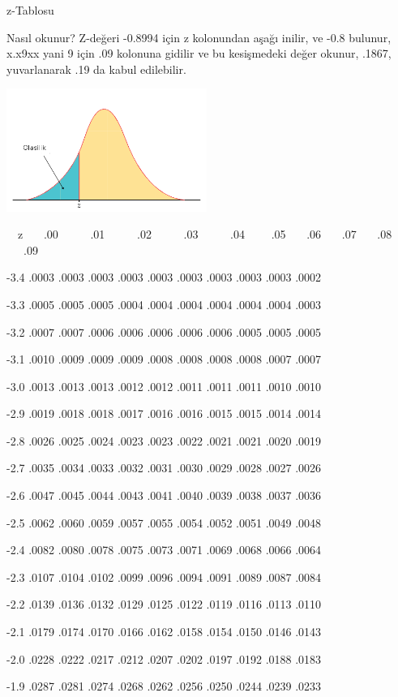 \documentclass[12pt,fleqn]{article}\usepackage{../../common}
\begin{document}
z-Tablosu

Nasıl okunur? Z-değeri -0.8994 için z kolonundan aşağı inilir, ve -0.8
bulunur, x.x9xx yani 9 için .09 kolonuna gidilir ve bu kesişmedeki değer
okunur, .1867, yuvarlanarak .19 da kabul edilebilir. 

\includegraphics[height=4cm]{stat_appendix_02.png}

\ \ z \ \ \  .00  \ \ \ \ \ .01 \ \ \ \ \ .02 \ \ \ \ \ .03 \ \ \ \ \ .04 \
\ \ \ .05 \ \ \ .06 \
\ \ .07 \ \ \ .08 \ \ \ .09

-3.4 .0003 .0003 .0003 .0003 .0003 .0003 .0003 .0003 .0003 .0002

-3.3 .0005 .0005 .0005 .0004 .0004 .0004 .0004 .0004 .0004 .0003

-3.2 .0007 .0007 .0006 .0006 .0006 .0006 .0006 .0005 .0005 .0005

-3.1 .0010 .0009 .0009 .0009 .0008 .0008 .0008 .0008 .0007 .0007

-3.0 .0013 .0013 .0013 .0012 .0012 .0011 .0011 .0011 .0010 .0010

-2.9 .0019 .0018 .0018 .0017 .0016 .0016 .0015 .0015 .0014 .0014

-2.8 .0026 .0025 .0024 .0023 .0023 .0022 .0021 .0021 .0020 .0019

-2.7 .0035 .0034 .0033 .0032 .0031 .0030 .0029 .0028 .0027 .0026

-2.6 .0047 .0045 .0044 .0043 .0041 .0040 .0039 .0038 .0037 .0036

-2.5 .0062 .0060 .0059 .0057 .0055 .0054 .0052 .0051 .0049 .0048

-2.4 .0082 .0080 .0078 .0075 .0073 .0071 .0069 .0068 .0066 .0064

-2.3 .0107 .0104 .0102 .0099 .0096 .0094 .0091 .0089 .0087 .0084

-2.2 .0139 .0136 .0132 .0129 .0125 .0122 .0119 .0116 .0113 .0110

-2.1 .0179 .0174 .0170 .0166 .0162 .0158 .0154 .0150 .0146 .0143

-2.0 .0228 .0222 .0217 .0212 .0207 .0202 .0197 .0192 .0188 .0183

-1.9 .0287 .0281 .0274 .0268 .0262 .0256 .0250 .0244 .0239 .0233
\end{document}
